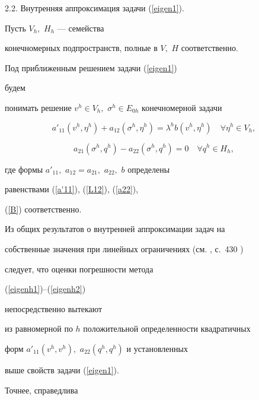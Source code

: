 2.2. Внутренняя аппроксимация задачи (\ref{eigen1}).


Пусть $ V_h,$ $ H_h$ --- семейства 


конечномерных подпространств, полные в $ V,$ $ H $ соответственно. 


Под приближенным решением задачи (\ref{eigen1}) 


будем


понимать решение $ v^h \in V_h,$ $\sigma^h \in E_{0h} $ конечномерной задачи


\begin{equation}


\label{eigenh1}


a'_{11}(v^h,\eta^h) + a_{12}(\sigma^h,\eta^h) = 


\lambda^h b(v^h,\eta^h) \quad


\forall \eta^h \in V_h,


\end{equation}


%


\begin{equation}


\label{eigenh2}


a_{21}(\sigma^h, q^h) - a_{22}(\sigma^h,q^h) = 0 \quad \forall 


q^h \in H_h,


\end{equation}


где формы $ a'_{11},$ $a_{12} = a_{21},$ $a_{22},$ $ b $ определены 


равенствами (\ref{a'11}), (\ref{L12}), (\ref{a22}),


(\ref{B}) соответственно.





Из общих результатов о внутренней аппроксимации задач на 


собственные значения при линейных ограничениях (см. \cite{Mer}, с.~430 )


следует, что оценки погрешности метода 


(\ref{eigenh1})--(\ref{eigenh2})


непосредственно вытекают


из равномерной по $h$ положительной определенности квадратичных


форм $a'_{11}(v^h, v^h),$ $a_{22}(q^h,q^h)$ и установленных


выше свойств задачи (\ref{eigen1}). 


Точнее, справедлива






